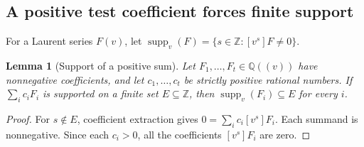 \documentclass[11pt,reqno]{amsart}
\newcommand{\ZZ}{\mathbb Z}
\newcommand{\QQ}{\mathbb Q}
\newcommand{\supp}{\operatorname{supp}}
\newtheorem{lemma}[theorem]{Lemma}
\theoremstyle{definition}
\theoremstyle{remark}
\numberwithin{equation}{section}
\begin{document}
\subsection{A positive test coefficient forces finite support}
For a Laurent series $F(v)$, let
$\supp_v(F)=\{s\in\ZZ:[v^s]F\ne0\}$.

\begin{lemma}[Support of a positive sum]\label{lem:positive-support}
Let $F_1,\ldots,F_t\in\QQ((v))$ have nonnegative coefficients, and
let $c_1,\ldots,c_t$ be strictly positive rational numbers.  If
$\sum_i c_iF_i$ is supported on a finite set $E\subseteq\ZZ$, then
$\supp_v(F_i)\subseteq E$ for every $i$.
\end{lemma}
\begin{proof}
For $s\notin E$, coefficient extraction gives
$0=\sum_i c_i[v^s]F_i$.  Each summand is nonnegative.  Since each
$c_i>0$, all the coefficients $[v^s]F_i$ are zero.
\end{proof}
\end{document}
